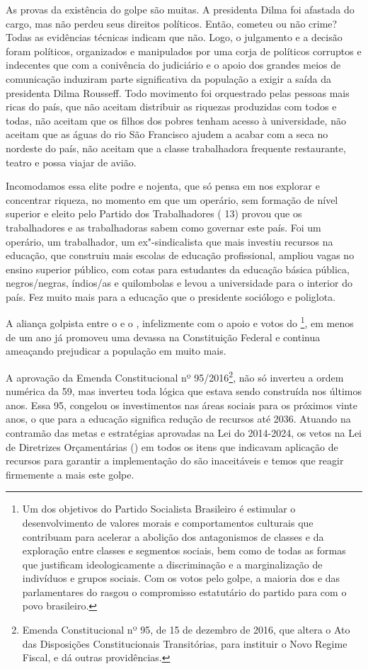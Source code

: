 As provas da existência do golpe são muitas. A presidenta Dilma foi
afastada do cargo, mas não perdeu seus direitos políticos. Então,
cometeu ou não crime? Todas as evidências técnicas indicam que não.
Logo, o julgamento e a decisão foram
políticos, organizados e manipulados por uma corja de políticos
corruptos e indecentes que com a conivência do judiciário e o apoio dos
grandes meios de comunicação induziram parte significativa da população
a exigir a saída da presidenta Dilma Rousseff. Todo movimento foi
orquestrado pelas pessoas mais ricas do país, que não aceitam distribuir
as riquezas produzidas com todos e todas, não aceitam que os filhos dos
pobres tenham acesso à universidade, não aceitam que as águas do rio São
Francisco ajudem a acabar com a seca no nordeste do país, não aceitam
que a classe trabalhadora frequente restaurante, teatro e possa viajar
de avião.

Incomodamos essa elite podre e nojenta, que só pensa em nos explorar e
concentrar riqueza, no momento em que um operário, sem formação de nível
superior e eleito pelo Partido dos Trabalhadores ( 13) provou que os
trabalhadores e as trabalhadoras sabem como governar este país. Foi um
operário, um trabalhador, um ex"-sindicalista que mais investiu recursos
na educação, que construiu mais escolas de educação profissional,
ampliou vagas no ensino superior público, com cotas para estudantes da
educação básica pública, negros/negras, índios/as e quilombolas e levou
a universidade para o interior do país. Fez muito mais para a educação
que o presidente sociólogo e poliglota.

A aliança golpista entre o  e o , infelizmente com o apoio
e votos do \footnote{Um dos objetivos do Partido
  Socialista Brasileiro é estimular o desenvolvimento de
  valores morais e comportamentos culturais que contribuam para acelerar
  a abolição dos antagonismos de classes e da exploração entre classes e
  segmentos sociais, bem como de todas as formas que justificam
  ideologicamente a discriminação e a marginalização de indivíduos e
  grupos sociais. Com os votos pelo golpe, a maioria dos e das
  parlamentares do  rasgou o compromisso estatutário do partido para
  com o povo brasileiro.}, em menos de um ano já promoveu uma devassa
na Constituição Federal e continua ameaçando prejudicar a população em
muito mais.

A aprovação da Emenda Constitucional nº 95/2016\footnote{Emenda
  Constitucional nº 95, de 15 de dezembro de 2016, que altera o Ato das
  Disposições Constitucionais Transitórias, para instituir o Novo Regime
  Fiscal, e dá outras providências.}, não só inverteu a ordem numérica
da  59, mas inverteu toda lógica que estava sendo construída nos
últimos anos. Essa  95, congelou os investimentos nas áreas sociais
para os próximos vinte anos, o que para a educação significa redução de
recursos até 2036. Atuando na contramão das metas e estratégias
aprovadas na Lei do  2014-2024, os vetos na Lei de Diretrizes
Orçamentárias () em todos os itens que indicavam aplicação de recursos
para garantir a implementação do  são inaceitáveis e temos que reagir
firmemente a mais este golpe.

